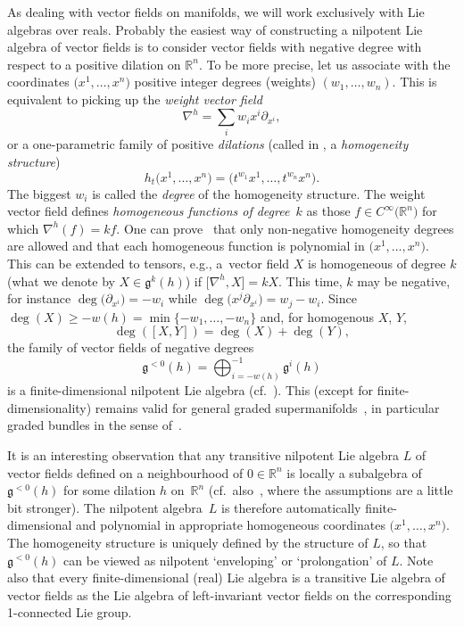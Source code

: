 \documentclass[pdftex]{sigma}
\numberwithin{equation}{section}
\begin{document}
As dealing with vector fields on manifolds, we will work exclusively with Lie algebras over reals.
Probably the easiest way of constructing a nilpotent Lie algebra of vector fields is to consider vector fields with negative degree with respect to a positive dilation on ${\mathbb R}^n$. To be more precise, let us associate with the coordinates $\big(x^1,\dots,x^n\big)$ positive integer degrees (weights) $(w_1,\dots,w_n)$. This is equivalent to picking up
the \emph{weight vector field}
\[
\nabla^h=\sum_iw_ix^i\partial_{x^i} ,
\] or a one-parametric family of positive \emph{dilations} (called in \cite{Bruce:16, Grabowski:2006,Grabowski:2012}, a \emph{homogeneity structure})
\[
h_t\big(x^1,\dots,x^n\big)=\big(t^{w_1}x^1,\dots,t^{w_n}x^n\big) .
\]
The biggest $w_i$ is called the \emph{degree} of the homogeneity structure. The weight vector field defines \emph{homogeneous functions of degree~$k$} as those $f\in C^\infty\big({\mathbb R}^n\big)$
for which $\nabla^h(f)=kf$. One can prove~\cite{Grabowski:2012} that only non-negative homogeneity degrees are allowed and that each homogeneous function is polynomial in $\big(x^1,\dots,x^n\big)$. This can be extended to tensors, e.g., a~vector field $X$ is homogeneous of degree $k$ (what we denote by $X\in\mathfrak{g}^k(h)$) if $\big[\nabla^h,X\big]=kX$. This time, $k$ may be negative, for instance $\deg\big(\partial_{x^i}\big)=-w_i$ while $\deg\big(x^j\partial_{x^i}\big)=w_j-w_i$.
Since $\deg(X)\ge -w(h)=\min\{-w_1,\dots,-w_n\}$ and, for homogenous $X$, $Y$,
\[ \deg([X,Y])=\deg(X)+\deg(Y) ,\]
the family of vector fields of negative degrees
\[ \mathfrak{g}^{<0}(h)=\bigoplus_{i=-w(h)}^{-1}\mathfrak{g}^i(h)\]
is a finite-dimensional nilpotent Lie algebra (cf.~\cite{JG90,MK88}).
This (except for finite-dimensionality) remains valid for general graded supermanifolds~\cite{Voronov10}, in particular graded bundles in the sense of~\cite{Grabowski:2012}.

It is an interesting observation that any transitive nilpotent Lie algebra $L$ of vector fields defined on a neighbourhood of $0\in{\mathbb R}^n$ is locally a subalgebra of $\mathfrak{g}^{<0}(h)$ for some dilation $h$ on~${\mathbb R}^n$ \cite{JG90} (cf.\ also~\cite{MK88}, where the assumptions are a little bit stronger). The nilpotent algebra~$L$ is therefore automatically finite-dimensional and polynomial in appropriate homogeneous coordinates $\big(x^1,\dots,x^n\big)$. The homogeneity structure is uniquely defined by the structure of $L$, so that $\mathfrak{g}^{<0}(h)$ can be viewed as nilpotent `enveloping' or `prolongation' of $L$. Note also that every finite-dimensional (real) Lie algebra is a transitive Lie algebra of vector fields as the Lie algebra of left-invariant vector fields on the corresponding 1-connected Lie group.
\end{document}
